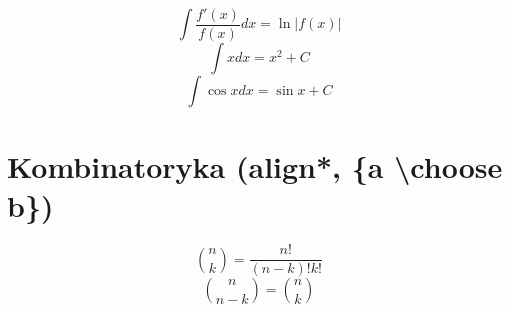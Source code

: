 \documentclass[12pt]{article}
\begin{document}
\begin{equation}
	\int \frac{f'(x)}{f(x)} dx = \ln{|f(x)|}
\end{equation}
\begin{equation}
	\int x dx = x^2 + C
\end{equation}
\begin{equation}
	\int \cos x dx = \sin x + C
\end{equation}

\section{Kombinatoryka (align*, \{a \textbackslash choose b\})}

$${n \choose k} = \frac{n!}{(n-k)!k!}$$
$${n \choose n - k} = {n \choose k}$$

\tableofcontents
\end{document}
